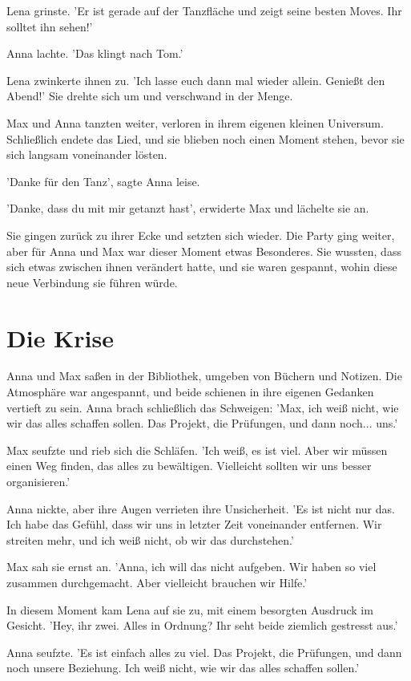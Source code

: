 \documentclass[12pt]{article}
\begin{document}
Lena grinste. 'Er ist gerade auf der Tanzfläche und zeigt seine besten Moves. Ihr solltet ihn sehen!'

Anna lachte. 'Das klingt nach Tom.'

Lena zwinkerte ihnen zu. 'Ich lasse euch dann mal wieder allein. Genießt den Abend!' Sie drehte sich um und verschwand in der Menge.

Max und Anna tanzten weiter, verloren in ihrem eigenen kleinen Universum. Schließlich endete das Lied, und sie blieben noch einen Moment stehen, bevor sie sich langsam voneinander lösten.

'Danke für den Tanz', sagte Anna leise.

'Danke, dass du mit mir getanzt hast', erwiderte Max und lächelte sie an.

Sie gingen zurück zu ihrer Ecke und setzten sich wieder. Die Party ging weiter, aber für Anna und Max war dieser Moment etwas Besonderes. Sie wussten, dass sich etwas zwischen ihnen verändert hatte, und sie waren gespannt, wohin diese neue Verbindung sie führen würde.

\section{ Die Krise }
 Anna und Max saßen in der Bibliothek, umgeben von Büchern und Notizen. Die Atmosphäre war angespannt, und beide schienen in ihre eigenen Gedanken vertieft zu sein. Anna brach schließlich das Schweigen: 'Max, ich weiß nicht, wie wir das alles schaffen sollen. Das Projekt, die Prüfungen, und dann noch... uns.'

Max seufzte und rieb sich die Schläfen. 'Ich weiß, es ist viel. Aber wir müssen einen Weg finden, das alles zu bewältigen. Vielleicht sollten wir uns besser organisieren.'

Anna nickte, aber ihre Augen verrieten ihre Unsicherheit. 'Es ist nicht nur das. Ich habe das Gefühl, dass wir uns in letzter Zeit voneinander entfernen. Wir streiten mehr, und ich weiß nicht, ob wir das durchstehen.'

Max sah sie ernst an. 'Anna, ich will das nicht aufgeben. Wir haben so viel zusammen durchgemacht. Aber vielleicht brauchen wir Hilfe.'

In diesem Moment kam Lena auf sie zu, mit einem besorgten Ausdruck im Gesicht. 'Hey, ihr zwei. Alles in Ordnung? Ihr seht beide ziemlich gestresst aus.'

Anna seufzte. 'Es ist einfach alles zu viel. Das Projekt, die Prüfungen, und dann noch unsere Beziehung. Ich weiß nicht, wie wir das alles schaffen sollen.'
\end{document}
